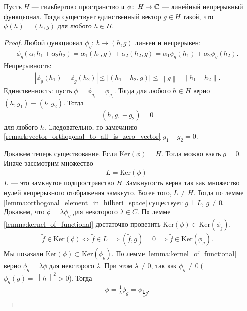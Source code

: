 \begin{thm}[%
Рисса]
\label{theorem:riss}
 Пусть $H$ --- гильбертово пространство и $\phi \colon\, H \to \mathbb{C} $ --- линейный непрерывный функционал. Тогда существует единственный вектор $g \in H$ такой, что $\phi(h) = (h, g)$ для любого  $h \in H$.
\end{thm}
\begin{proof}
 Любой функционал $\phi_g \colon\, h \mapsto (h, g)$ линеен и непрерывен: \begin{align*}
  \phi_g(\alpha_1 h_1 + \alpha_2 h_2) = \alpha_1 (h_1, g) + \alpha_2(h_2, g) = \alpha_1 \phi_g(h_1) + \alpha_2 \phi_g(h_2)
 .\end{align*} Непрерывность: \begin{align*}
  \left| \phi_g(h_1) - \phi_g(h_2) \right| \leqslant \left| (h_1 - h_2, g) \right| \leqslant \left\| g \right\| \cdot \left\| h_1 - h_2 \right\|
 .\end{align*} Единственность: пусть $\phi = \phi_{g_1} = \phi_{g_2}$. Тогда для любого $h \in H$ верно $(h, g_1) = (h, g_2)$. Тогда \begin{align*}
 (h, g_1 - g_2) = 0
\end{align*} для любого $h$. Следовательно, по замечанию \ref{remark:vector_orthogonal_to_all_is_zero_vector} $g_1 - g_2 = 0$.

Докажем теперь существование. Если  $\mathrm{Ker}(\phi) = H$. Тогда можно взять  $g = 0$. Иначе рассмотрим множество \begin{align*}
 L = \mathrm{Ker}(\phi)
.\end{align*} $L$ --- это замкнутое подпространство $H$. Замкнутость верна так как множество нулей непрерывного отображения замкнуто. Более того, $L \neq H$. Тогда по лемме \ref{lemma:orthogonal_element_in_hilbert_space} существует $g \perp L$, $g \neq 0$. Докажем, что $\phi = \lambda \phi_g$ для некоторого $\lambda \in C$. По лемме \ref{lemma:kernel_of_functional} достаточно проверить $\mathrm{Ker}(\phi) \subset \mathrm{Ker}(\phi_g)$.
\begin{align*}
 \tilde f \in \mathrm{Ker}(\phi) \iff \tilde f \in L \implies (\tilde f, g) = 0 \implies \tilde f \in \mathrm{Ker}(\phi_g)
.\end{align*} Мы показали $\mathrm{Ker}(\phi) \subset \mathrm{Ker}(\phi_g)$. По лемме \ref{lemma:kernel_of_functional} верно $\phi_g = \lambda \phi$ для некоторого $\lambda$. При этом  $\lambda \neq 0$, так как $\phi_g \neq 0$ ($\phi_g(g) = \left\| h \right\|^{2} > 0$). Тогда \begin{align*}
\phi = \frac{1}{\lambda}\phi_g = \phi_{\frac{1}{\overline \lambda} g}
.\end{align*} 
\end{proof}

